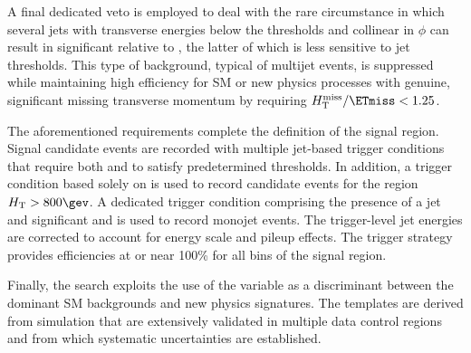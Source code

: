 
A final dedicated veto is employed to deal with the rare circumstance
in which several jets with transverse energies below the \Et
thresholds and collinear in $\phi$ can result in significant \mht
relative to \ETmiss, the latter of which is less sensitive to jet
thresholds. This type of background, typical of multijet events, is
suppressed while maintaining high efficiency for SM or new physics
processes with genuine, significant missing transverse momentum by
requiring $\mht / \ETmiss < 1.25$. 

The aforementioned requirements complete the definition of the signal
region. Signal candidate events are recorded with multiple jet-based
trigger conditions that require both \scalht and \alphat to satisfy
predetermined thresholds. In addition, a trigger condition based
solely on \scalht is used to record candidate events for
the region $\scalht > 800\gev$. A dedicated trigger condition
comprising the presence of a jet and significant \mht and \ETmiss is
used to record monojet events. The trigger-level jet energies are
corrected to account for energy scale and pileup effects. The trigger
strategy provides efficiencies at or near 100\% for all bins of the
signal region.

Finally, the search exploits the use of the \mht variable as a
discriminant between the dominant SM backgrounds and new physics
signatures. The \mht templates are derived from simulation that are
extensively validated in multiple data control regions and from which
systematic uncertainties are established.
